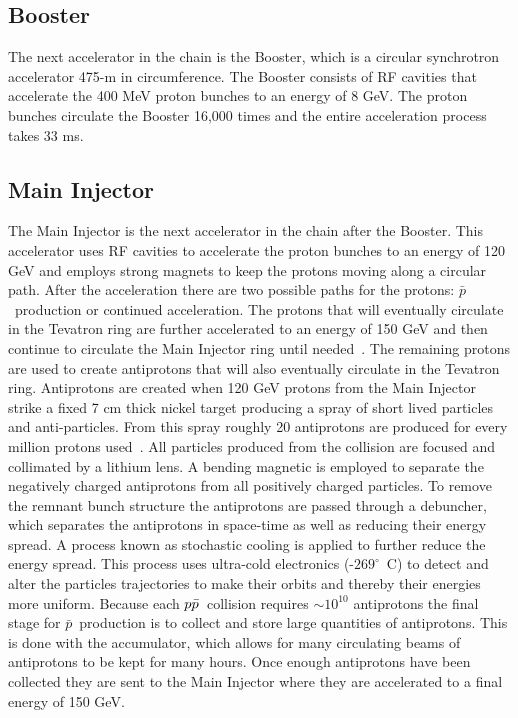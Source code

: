 \subsection{Booster}
The next accelerator in the chain is the Booster, which is a circular synchrotron accelerator 475-m in circumference. The Booster consists of RF cavities that accelerate the 400 MeV proton bunches to an energy of 8 GeV. The proton bunches circulate the Booster 16,000 times and the entire acceleration process takes 33 ms.

\subsection{Main Injector}
The Main Injector is the next accelerator in the chain after the Booster. This accelerator uses RF cavities to accelerate the proton bunches to an energy of 120 GeV and employs strong magnets to keep the protons moving along a circular path. After the acceleration there are two possible paths for the protons: $\bar{p}$~production or continued acceleration. The protons that will eventually circulate in the Tevatron ring are further accelerated to an energy of 150 GeV and then continue to circulate the Main Injector ring until needed~\cite{proton}. The remaining protons are used to create antiprotons that will also eventually circulate in the Tevatron ring. Antiprotons are created when 120 GeV protons from the Main Injector strike a fixed 7 cm thick nickel target producing a spray of short lived particles and anti-particles. From this spray roughly 20 antiprotons are produced for every million protons used~\cite{Antiproton}. All particles produced from the collision are focused and collimated by a lithium lens. A bending magnetic is employed to separate the negatively charged antiprotons from all positively charged particles. To remove the remnant bunch structure the antiprotons are passed through a debuncher, which separates the antiprotons in space-time as well as reducing their energy spread. A process known as stochastic cooling is applied to further reduce the energy spread. This process uses ultra-cold electronics (-$269^{\circ}$~C) to detect and alter the particles trajectories to make their orbits and thereby their energies more uniform. Because each $\mbox{$p\bar{p}$}$~collision requires $\sim10^{10}$ antiprotons the final stage for $\bar{p}$~production is to collect and store large quantities of antiprotons. This is done with the accumulator, which allows for many circulating beams of antiprotons to be kept for many hours. Once enough antiprotons have been collected they are sent to the Main Injector where they are accelerated to a final energy of 150 GeV.

